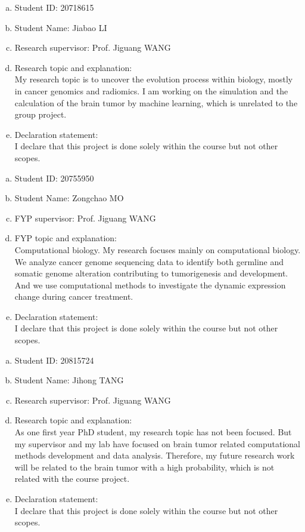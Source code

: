 \documentclass[11pt]{article}
\begin{document}
\begin{member}
	\begin{enumerate}[(a)]
		\item Student ID: 20718615
		\item Student Name: Jiabao LI
		\item Research supervisor: Prof. Jiguang WANG
		\item Research topic and explanation: \\
		My research topic is to uncover the evolution process within biology, mostly in cancer genomics and radiomics. I am working on the simulation and the calculation of the brain tumor by machine learning, which is unrelated to the group project.
		\item Declaration statement: \\
		I declare that this project is done solely within the course but not other scopes.
	\end{enumerate}
\end{member}

\begin{member}
	\begin{enumerate}[(a)]
		\item Student ID: 20755950
		\item Student Name: Zongchao MO
		\item FYP supervisor: Prof. Jiguang WANG
		\item FYP topic and explanation: \\
		Computational biology. My research focuses mainly on computational biology. We analyze cancer genome sequencing data to identify both germline and somatic genome alteration contributing to tumorigenesis and development. And we use computational methods to investigate the dynamic expression change during cancer treatment.
		\item Declaration statement: \\
		I declare that this project is done solely within the course but not other scopes.
	\end{enumerate}
\end{member}

\begin{member}
	\begin{enumerate}[(a)]
		\item Student ID: 20815724
		\item Student Name: Jihong TANG
		\item Research supervisor: Prof. Jiguang WANG
		\item Research topic and explanation: \\
		As one first year PhD student, my research topic has not been focused. But my supervisor and my lab have focused on brain tumor related computational  methods development and data analysis. Therefore, my future research work will be related to the brain tumor with a high probability, which is not related with the course project.
		\item Declaration statement: \\
		I declare that this project is done solely within the course but not other scopes.
	\end{enumerate}
\end{member}
\end{document}
